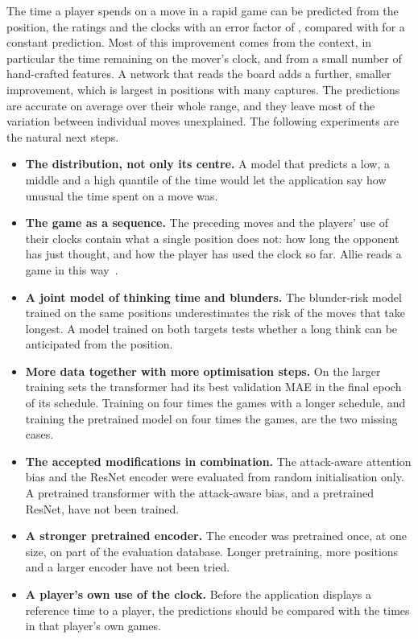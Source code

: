\documentclass[11pt]{article}
\begin{document}
The time a player spends on a move in a rapid game can be predicted from the
position, the ratings and the clocks with an error factor of
, compared with  for a constant
prediction. Most of this improvement comes from the context, in particular
the time remaining on the mover's clock, and from a small number of
hand-crafted features. A network that reads the board adds a further, smaller
improvement, which is largest in positions with many captures. The
predictions are accurate on average over their whole range, and they leave
most of the variation between individual moves unexplained. The following
experiments are the natural next steps.
\begin{itemize}
\item \textbf{The distribution, not only its centre.} A model that predicts
a low, a middle and a high quantile of the time would let the application say
how unusual the time spent on a move was.
\item \textbf{The game as a sequence.} The preceding moves and the players'
use of their clocks contain what a single position does not: how long the
opponent has just thought, and how the player has used the clock so far.
Allie reads a game in this way~\cite{allie}.
\item \textbf{A joint model of thinking time and blunders.} The blunder-risk
model trained on the same positions underestimates the risk of the moves that
take longest. A model trained on both targets tests whether a long think can
be anticipated from the position.
\ifmore
\item \textbf{More data together with more optimisation steps.} On the
larger training sets the transformer had its best validation MAE in the
final epoch of its schedule. Training on four times the games with a longer
schedule, and training the pretrained model on four times the games, are the
two missing cases.
\fi
\ifshapes
\ifchangestart
\item \textbf{The accepted modifications in combination.} The attack-aware
attention bias and the ResNet encoder were evaluated from random
initialisation only. A pretrained transformer with the attack-aware bias, and
a pretrained ResNet, have not been trained.
\fi
\fi
\ifchangestart
\item \textbf{A stronger pretrained encoder.} The encoder was pretrained
once, at one size, on part of the evaluation database. Longer pretraining,
more positions and a larger encoder have not been tried.
\fi
\item \textbf{A player's own use of the clock.} Before the application
displays a reference time to a player, the predictions should be compared
with the times in that player's own games.
\end{itemize}
\end{document}
